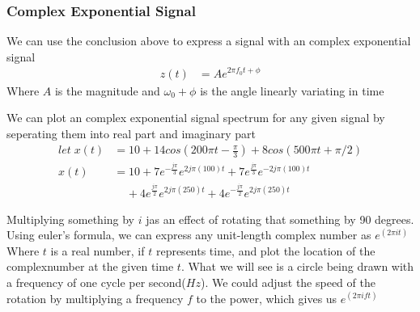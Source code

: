 \documentclass{article}
\begin{document}
    \subsubsection{Complex Exponential Signal}

    We can use the conclusion above to express a signal with an complex exponential signal
    \begin{align}
        z(t) &= Ae^{2 \pi f_0 t + \phi}
    \end{align}
    Where $A$ is the magnitude and $\omega_0 + \phi$ is the angle linearly variating in time 

    We can plot an complex exponential signal spectrum for any given signal by seperating them into real part and imaginary part
    \begin{align}
        let\; x(t) &= 10 + 14 cos(200 \pi t - \frac{\pi}{3}) + 8 cos(500 \pi t + \pi/2)\\
        x(t) &= 10 + 7e^{-\frac{j\pi}{3}} e^{2j\pi(100)t} + 7e^{\frac{j\pi}{3}} e^{-2j\pi(100)t}\\
        &\;\;\;\; + 4e^{\frac{j\pi}{2}} e^{2j\pi(250)t} + 4e^{-\frac{j\pi}{2}} e^{2j\pi(250)t} \nonumber
    \end{align}

    \begin{center}
    \end{center}

    Multiplying something by $i$ jas an effect of rotating that something by 90 degrees. 
    Using euler's formula, we can express any unit-length complex number as $e ^ {(2 \pi i t)}$
    Where $t$ is a real number, if $t$ represents time, 
    and plot the location of the complexnumber at the given time $t$.
    What we will see is a circle being drawn with a frequency of one cycle per second($Hz$).
    We could adjust the speed of the rotation by multiplying a frequency $f$ to the power, 
    which gives us $e ^ {(2 \pi i f t)}$\\
\end{document}
